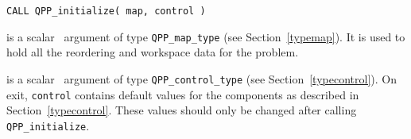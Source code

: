 \documentclass{galahad}
\newcommand{\packagename}{QPP}
\begin{document}
\hspace{8mm}
{\tt CALL \packagename\_initialize( map, control )}

\vspace*{-2mm}
\begin{description}

 is a scalar \intentout\ argument of type 
{\tt \packagename\_map\_type} (see Section~\ref{typemap}). 
It is used to hold all the reordering and workspace data for the problem. 

 is a scalar \intentout\ argument of type 
{\tt \packagename\_control\_type}
(see Section~\ref{typecontrol}). 
On exit, {\tt control} contains default values for the components as
described in Section~\ref{typecontrol}.
These values should only be changed after calling 
{\tt \packagename\_initialize}.

\end{description}

\end{document}
